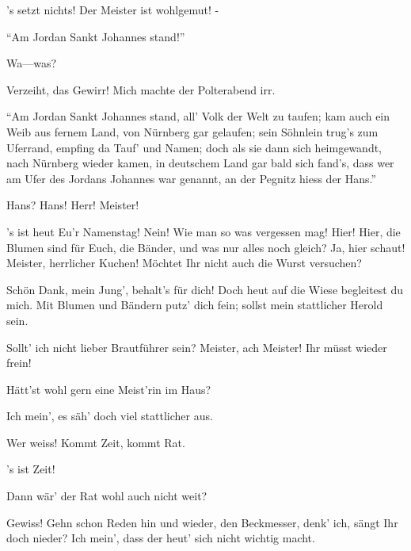 \begin{drama}

's setzt nichts! Der Meister ist wohlgemut! -


``Am Jordan Sankt Johannes stand!''

\Sachsspeaks
Wa---was?

\Davidspeaks


Verzeiht, das Gewirr! Mich machte der Polterabend irr.


``Am Jordan Sankt Johannes stand,
all' Volk der Welt zu taufen;
kam auch ein Weib aus fernem Land,
von Nürnberg gar gelaufen;
sein Söhnlein trug's zum Uferrand,
empfing da Tauf' und Namen;
doch als sie dann sich heimgewandt,
nach Nürnberg wieder kamen,
in deutschem Land gar bald sich fand's,
dass wer am Ufer des Jordans
Johannes war genannt,
an der Pegnitz hiess der Hans.''


Hans? Hans!
Herr! Meister!


's ist heut Eu'r Namenstag!
Nein! Wie man so was vergessen mag!
Hier! Hier, die Blumen sind für Euch,
die Bänder, und was nur alles noch gleich?
Ja, hier schaut! Meister, herrlicher Kuchen!
Möchtet Ihr nicht auch die Wurst versuchen?

\Sachsspeaks


Schön Dank, mein Jung', behalt's für dich!
Doch heut auf die Wiese begleitest du mich.
Mit Blumen und Bändern putz' dich fein;
sollst mein stattlicher Herold sein.

\Davidspeaks
Sollt' ich nicht lieber Brautführer sein?
Meister, ach Meister! Ihr müsst wieder frein!

\Sachsspeaks
Hätt'st wohl gern eine Meist'rin im Haus?

\Davidspeaks
Ich mein', es säh' doch viel stattlicher aus.

\Sachsspeaks
Wer weiss! Kommt Zeit, kommt Rat.

\Davidspeaks
's ist Zeit!

\Sachsspeaks
Dann wär' der Rat wohl auch nicht weit?

\Davidspeaks
Gewiss! Gehn schon Reden hin und wieder,
den Beckmesser, denk' ich, sängt Ihr doch nieder?
Ich mein', dass der heut' sich nicht wichtig macht.


\end{drama}
